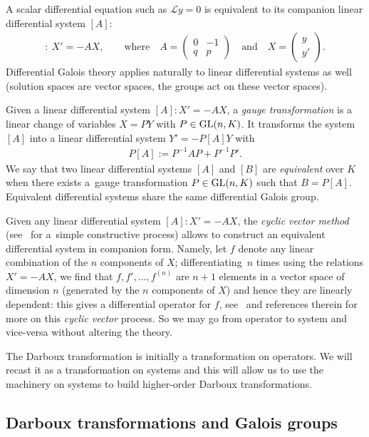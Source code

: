 \documentclass[10pt,a4paper]{amsart}
\numberwithin{equation}{section}
\begin{document}
A scalar differential equation such as $\mathcal Ly=0$ is equivalent to its companion linear differential system $[A]$:
\begin{gather*}%
[A]\colon\ X'=-AX,\qquad \text{where}\quad A=\begin{pmatrix}0&-1\\ q& p\end{pmatrix}
\quad \text{and}\quad X=\begin{pmatrix} y \\ y'\end{pmatrix}\!.
\end{gather*}
Differential Galois theory applies naturally to linear differential systems as well (solution spaces are vector spaces, the groups act on these vector spaces).

Given a linear differential system $[A]\colon X'=-AX$, a \emph{gauge transformation} is a linear change of variables $X=PY$ with $P \in {\rm GL}(n,K)$. It transforms the system $[A]$ into a linear differential system $Y'=-P[A] Y$ with
\begin{gather*}
P[A]:= P^{-1} A P + P^{-1} P'.
\end{gather*}
We say that two linear differential systems $[A]$ and $[B]$ are \emph{equivalent} over $K$ when there exists a~gauge transformation $P \in {\rm GL}(n,K)$ such that $B=P[A]$. Equivalent differential systems share the same differential Galois group.

Given any linear differential system $[A]\colon X'=-AX$, the \emph{cyclic vector method} (see~\cite{Ba93a} for a~simple constructive process) allows to construct an equivalent differential system in companion form. Namely, let $f$ denote any linear combination of the $n$ components of $X$; differentiating~$n$ times using the relations $X'=-AX$, we find that $f, f', \ldots, f^{(n)}$ are $n+1$ elements in a vector space of dimension $n$ (generated by the $n$ components of $X$) and hence they are linearly dependent: this gives a differential operator for $f$, see~\cite{Ba93a} and references therein for more on this \emph{cyclic vector} process. So we may go from operator to system and vice-versa without altering the theory.

The Darboux transformation is initially a transformation on operators. We will recast it as a transformation on systems and this will allow us to use the machinery on systems to build higher-order Darboux transformations.

\subsection{Darboux transformations and Galois groups}
\end{document}
